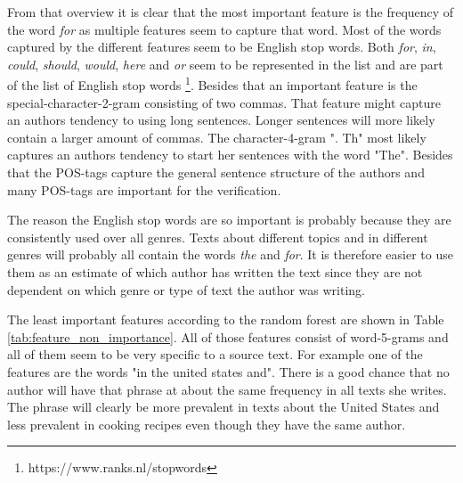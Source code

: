 From that overview it is clear that the most important feature is the frequency
of the word \textit{for} as multiple features seem to capture that word. Most
of the words captured by the different features seem to be English stop words.
Both \textit{for}, \textit{in}, \textit{could}, \textit{should}, \textit{would},
\textit{here} and \textit{or} seem to be represented in the list and are part
of the list of English stop words \footnote{https://www.ranks.nl/stopwords}.
Besides that an important feature is the special-character-2-gram consisting
of two commas. That feature might capture an authors tendency to using long
sentences. Longer sentences will more likely contain a larger amount of commas.
The character-4-gram ". Th" most likely captures an authors tendency to start
her sentences with the word "The". Besides that the \gls{POS}-tags capture the
general sentence structure of the authors and many \gls{POS}-tags are important
for the verification.

The reason the English stop words are so important is probably because they are
consistently used over all genres. Texts about different topics and in different
genres will probably all contain the words \textit{the} and \textit{for}. It
is therefore easier to use them as an estimate of which author has written the
text since they are not dependent on which genre or type of text the author was
writing.

The least important features according to the random forest are shown in Table
\ref{tab:feature_non_importance}. All of those features consist of word-5-grams
and all of them seem to be very specific to a source text. For example one of
the features are the words "in the united states and". There is a good chance
that no author will have that phrase at about the same frequency in all texts
she writes. The phrase will clearly be more prevalent in texts about the United
States and less prevalent in cooking recipes even though they have the same
author.

